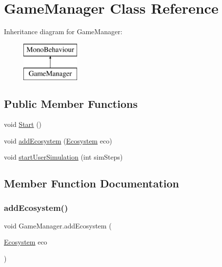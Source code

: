\hypertarget{class_game_manager}{}\section{Game\+Manager Class Reference}
\label{class_game_manager}
Inheritance diagram for Game\+Manager\+:\begin{figure}[H]
\begin{center}
\leavevmode
\includegraphics[height=2.000000cm]{class_game_manager}
\end{center}
\end{figure}
\subsection*{Public Member Functions}
\begin{DoxyCompactItemize}
\item 
void \mbox{\hyperlink{class_game_manager_a5ccfacd027ad08eeb4ff1f25a7f59c98}{Start}} ()
\item 
void \mbox{\hyperlink{class_game_manager_a5ef457428a5dca16616bd717a7e5aec9}{add\+Ecosystem}} (\mbox{\hyperlink{class_ecosystem}{Ecosystem}} eco)
\item 
void \mbox{\hyperlink{class_game_manager_ae6f288a4230d1cf2e5ed42614fcfc12a}{start\+User\+Simulation}} (int sim\+Steps)
\end{DoxyCompactItemize}


\subsection{Member Function Documentation}
\mbox{\label{class_game_manager_a5ef457428a5dca16616bd717a7e5aec9}} 
\subsubsection{\texorpdfstring{add\+Ecosystem()}{addEcosystem()}}
{\footnotesize\ttfamily void Game\+Manager.\+add\+Ecosystem (\begin{DoxyParamCaption}\item[{\mbox{\hyperlink{class_ecosystem}{Ecosystem}}}]{eco }\end{DoxyParamCaption})}

